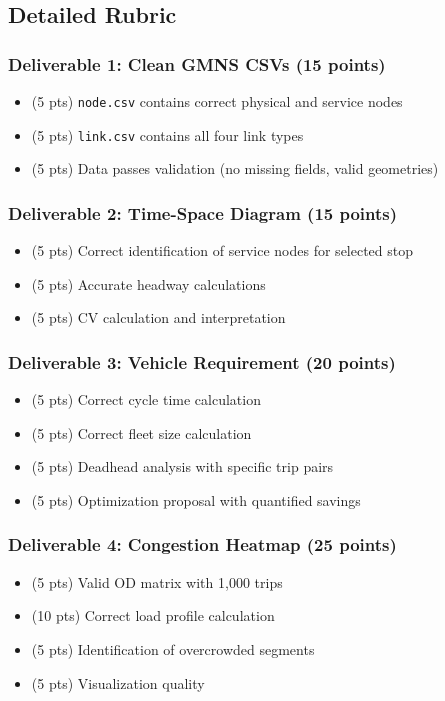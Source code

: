 \documentclass[11pt,letterpaper]{article}
\begin{document}
\subsection{Detailed Rubric}

\subsubsection*{Deliverable 1: Clean GMNS CSVs (15 points)}
\begin{itemize}[nosep]
    \item (5 pts) \texttt{node.csv} contains correct physical and service nodes
    \item (5 pts) \texttt{link.csv} contains all four link types
    \item (5 pts) Data passes validation (no missing fields, valid geometries)
\end{itemize}

\subsubsection*{Deliverable 2: Time-Space Diagram (15 points)}
\begin{itemize}[nosep]
    \item (5 pts) Correct identification of service nodes for selected stop
    \item (5 pts) Accurate headway calculations
    \item (5 pts) CV calculation and interpretation
\end{itemize}

\subsubsection*{Deliverable 3: Vehicle Requirement (20 points)}
\begin{itemize}[nosep]
    \item (5 pts) Correct cycle time calculation
    \item (5 pts) Correct fleet size calculation
    \item (5 pts) Deadhead analysis with specific trip pairs
    \item (5 pts) Optimization proposal with quantified savings
\end{itemize}

\subsubsection*{Deliverable 4: Congestion Heatmap (25 points)}
\begin{itemize}[nosep]
    \item (5 pts) Valid OD matrix with 1,000 trips
    \item (10 pts) Correct load profile calculation
    \item (5 pts) Identification of overcrowded segments
    \item (5 pts) Visualization quality
\end{itemize}
\end{document}
